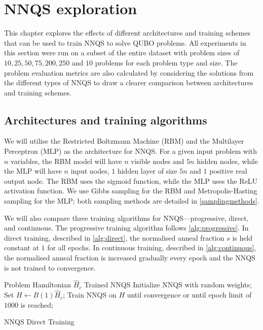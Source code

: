 \chapter{NNQS exploration}\label{nnqsresults}
This chapter explores the effects of different architectures and training schemes that can be used to train NNQS to solve QUBO problems. All experiments in this section were run on a subset of the entire dataset with problem sizes of $10,25,50,75,200,250$ and $10$ problems for each problem type and size. The problem evaluation metrics are also calculated by considering the solutions from the different types of NNQS to draw a clearer comparison between architectures and training schemes.

\section{Architectures and training algorithms}
We will utilise the Restricted Boltzmann Machine (RBM) and the Multilayer Perceptron (MLP) as the architecture for NNQS. For a given input problem with $n$ variables, the RBM model will have $n$ visible nodes and $5n$ hidden nodes, while the MLP will have $n$ input nodes, $1$ hidden layer of size $5n$ and $1$ positive real output node. The RBM uses the sigmoid function, while the MLP uses the ReLU activation function. We use Gibbs sampling for the RBM and Metropolis-Hasting sampling for the MLP; both sampling methods are detailed in \autoref{samplingmethods}.

We will also compare three training algorithms for NNQS---progressive, direct, and continuous. The progressive training algorithm follows \autoref{alg:progressive}. In direct training, described in \autoref{alg:direct}, the normalised anneal fraction $s$ is held constant at $1$ for all epochs. In continuous training, described in \autoref{alg:continuous}, the normalised anneal fraction is increased gradually every epoch and the NNQS is not trained to convergence.

\begin{algorithm}
    \begin{algorithmic}
    \Require Problem Hamiltonian $\hat{H}_c$
    \Ensure Trained NNQS
    \State Initialize NNQS with random weights;
    \State Set $H \leftarrow B(1)\hat{H}_c$;
    \State Train NNQS on $H$ until convergence or until epoch limit of $1000$ is reached;
    \end{algorithmic}
    \caption{NNQS Direct Training}
    \label{alg:direct}
\end{algorithm}


